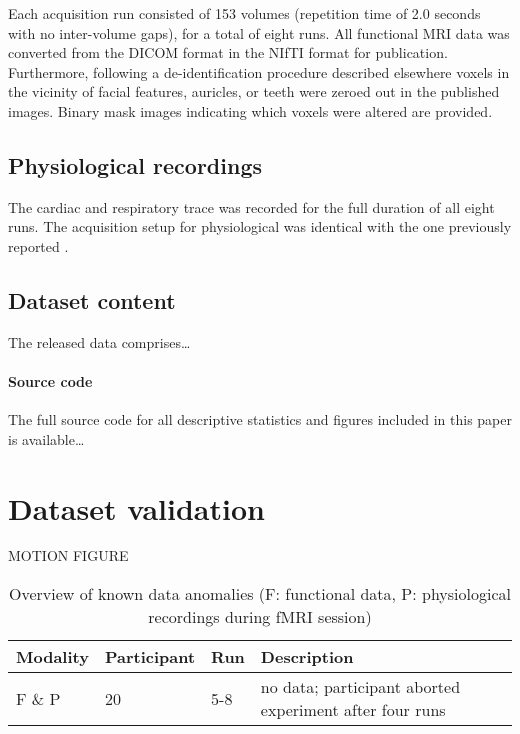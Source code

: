 Each acquisition run consisted of 153 volumes (repetition time of 2.0 seconds
with no inter-volume gaps), for a total of eight runs. All functional MRI data
was converted from the DICOM format in the NIfTI format for publication.
Furthermore, following a de-identification procedure described elsewhere
\cite{HBI+14} voxels in the vicinity of facial features, auricles, or teeth
were zeroed out in the published images. Binary mask images indicating which
voxels were altered are provided.

\subsection*{Physiological recordings}

The cardiac and respiratory trace was recorded for the full duration of all
eight runs. The acquisition setup for physiological was identical with the one
previously reported \cite{HBI+14}.

\subsection*{Dataset content}

The released data comprises\ldots

\paragraph{Source code}

The full source code for all descriptive statistics and figures included in
this paper is available\ldots

\section*{Dataset validation}



MOTION FIGURE


\begin{table}
  \centering
  \caption{Overview of known data anomalies (F: functional data,
    P: physiological recordings during fMRI session)}
  {\renewcommand{\arraystretch}{1.2}
  \begin{tabular}{lllp{9cm}}
    \toprule
    Modality & Participant & Run & Description \\
    \midrule
    F \& P & 20 & 5-8 & no data; participant aborted experiment after four runs \\
    \bottomrule
  \end{tabular}
}
  \label{tab:anomalies}
\end{table}


